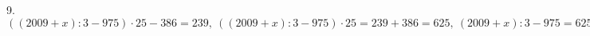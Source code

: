 9. $((2009+x):3-975)\cdot25-386=239,\ ((2009+x):3-975)\cdot25=239+386=625,\ (2009+x):3-975=625:25=25,\ (2009+x):3=25+975=1000,\ 2009+x=3\cdot1000=3000,\ x=3000-2009=991.$\\
